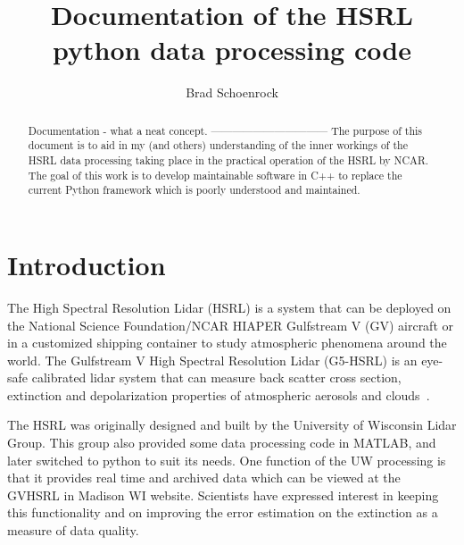 \documentclass[a4paper,12pt]{report}
\begin{document}
\author{Brad Schoenrock} 
\title{Documentation of the HSRL python data processing code}
\maketitle

\begin{abstract}
Documentation - what a neat concept.
\newline
\newline
---------------------------------
\newline
\newline
The purpose of this document is to aid in my (and others) understanding of the inner workings of the HSRL data processing taking place in the practical operation of the HSRL by NCAR. The goal of this work is to develop maintainable software in C++ to replace the current Python framework which is poorly understood and maintained. 

\end{abstract}

\tableofcontents

\newpage

\section{Introduction}
\label{SECTION-Introduction}

The High Spectral Resolution Lidar (HSRL) is a system that can be deployed on the National Science Foundation/NCAR HIAPER Gulfstream V (GV) aircraft or in a customized shipping container to study atmospheric phenomena around the world. The Gulfstream V High Spectral Resolution Lidar (G5-HSRL) is an eye-safe calibrated lidar system that can measure back scatter cross section, extinction and depolarization properties of atmospheric aerosols and clouds~\cite{HSRLpage}.

The HSRL was originally designed and built by the University of Wisconsin Lidar Group. This group also provided some data processing code in MATLAB, and later switched to python to suit its needs. One function of the UW processing is that it provides real time and archived data which can be viewed at the GVHSRL in Madison WI website. Scientists have expressed interest in keeping this functionality and on improving the error estimation on the extinction as a measure of data quality. 







\newpage


{}

\end{document}
